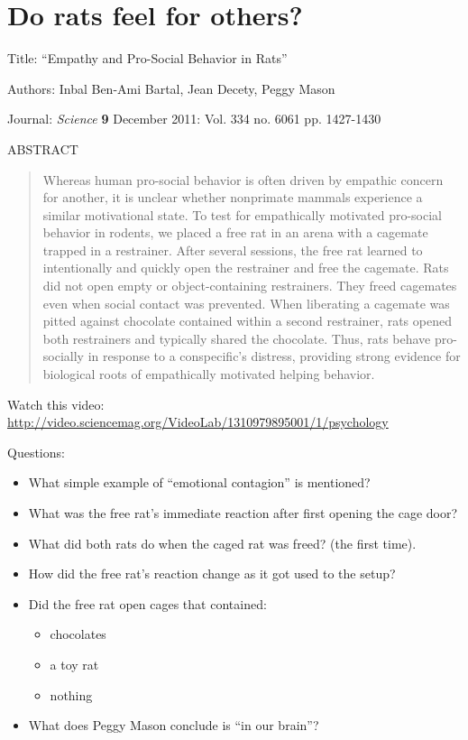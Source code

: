 \def\theTopic{Reading 5}

\section{Do rats feel for others?}

Title:  ``Empathy and Pro-Social Behavior in Rats''

Authors: Inbal Ben-Ami Bartal, Jean Decety, Peggy Mason

Journal: {\it Science} {\bf 9} December 2011: Vol. 334 no. 6061 pp. 1427-1430 

ABSTRACT\\
\begin{quotation}
  Whereas human pro-social behavior is often driven by empathic concern
for another, it is unclear whether nonprimate mammals experience a
similar motivational state. To test for empathically motivated
pro-social behavior in rodents, we placed a free rat in an arena with
a cagemate trapped in a restrainer. After several sessions, the free
rat learned to intentionally and quickly open the restrainer and free
the cagemate. Rats did not open empty or object-containing
restrainers. They freed cagemates even when social contact was
prevented. When liberating a cagemate was pitted against chocolate
contained within a second restrainer, rats opened both restrainers and
typically shared the chocolate. Thus, rats behave pro-socially in
response to a conspecific’s distress, providing strong evidence for
biological roots of empathically motivated helping behavior. 
\end{quotation}

Watch this video:\\
\url{http://video.sciencemag.org/VideoLab/1310979895001/1/psychology}\vfill

Questions:
\begin{itemize}
\item What simple example of ``emotional contagion'' is mentioned? \vfill
\item What was the free rat's immediate reaction after first opening
  the cage door?  \vfill
\item What did both rats do when the caged rat was freed? (the first
  time). \vfill
\item How did the free rat's reaction change as it got used to the
  setup?  \vfill
\item Did the free rat open cages that contained:
  \begin{itemize}
  \item chocolates
  \item a toy rat
  \item nothing \vfill
  \end{itemize}
\item What does Peggy Mason conclude is ``in our brain''?\vspace*{\fill}
\end{itemize}
